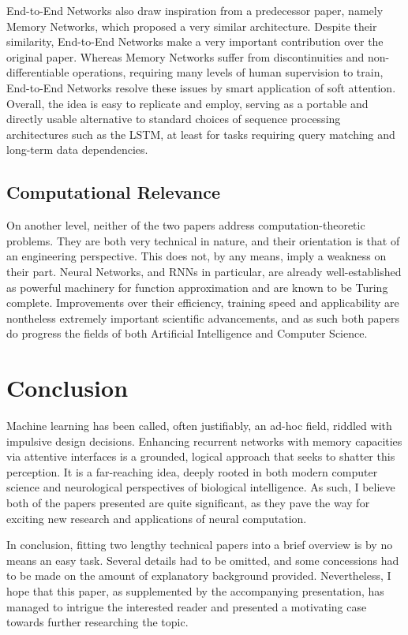 \documentclass[]{article}
\begin{document}
End-to-End Networks also draw inspiration from a predecessor paper, namely Memory Networks\cite{DBLP:journals/corr/WestonCB14}, which proposed a very similar architecture. Despite their similarity, End-to-End Networks make a very important contribution over the original paper. Whereas Memory Networks suffer from discontinuities and non-differentiable operations, requiring many levels of human supervision to train, End-to-End Networks resolve these issues by smart application of soft attention. Overall, the idea is easy to replicate and employ, serving as a portable and directly usable alternative to standard choices of sequence processing architectures such as the LSTM, at least for tasks requiring query matching and long-term data dependencies.

\subsection{Computational Relevance}
On another level, neither of the two papers address computation-theoretic problems. They are both very technical in nature, and their orientation is that of an engineering perspective. This does not, by any means, imply a weakness on their part. Neural Networks, and RNNs in particular, are already well-established as powerful machinery for function approximation\cite{Cybenko1989} and are known to be Turing complete\cite{SIEGELMANN1995132}. Improvements over their efficiency, training speed and applicability are nontheless extremely important scientific advancements, and as such both papers do progress the fields of both Artificial Intelligence and Computer Science. 

\section{Conclusion}
\label{Conc}
Machine learning has been called, often justifiably, an ad-hoc field, riddled with impulsive design decisions. Enhancing recurrent networks with memory capacities via attentive interfaces is a grounded, logical approach that seeks to shatter this perception. It is a far-reaching idea, deeply rooted in both modern computer science and neurological perspectives of biological intelligence. As such, I believe both of the papers presented are quite significant, as they pave the way for exciting new research and applications of neural computation.

In conclusion, fitting two lengthy technical papers into a brief overview is by no means an easy task. Several details had to be omitted, and some concessions had to be made on the amount of explanatory background provided. Nevertheless, I hope that this paper, as supplemented by the accompanying presentation, has managed to intrigue the interested reader and presented a motivating case towards further researching the topic. 



\end{document}
